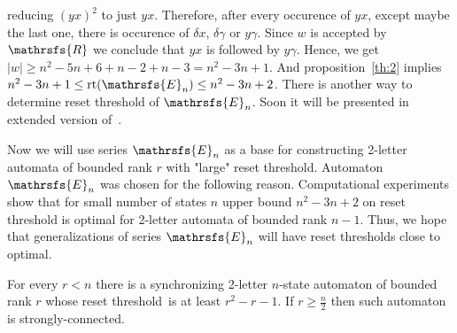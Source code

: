 \documentclass[11pt]{llncs}
\newcommand{\rl}{reset threshold}
\newcommand{\R}{\mathrsfs{R}}
\newcommand{\g}{\gamma}
\newcommand{\dl}{\delta}
\newcommand{\rt}{\mathrm{rt}}
\newcommand{\rtc}{\mathrm{rt}_{c}}
\begin{document}
reducing $(yx)^2$ to just $yx$. Therefore, after every occurence of $yx$, except maybe the last one, there is occurence 
of $\dl x$, $\dl \g$ or $y \g$. Since $w$ is accepted by $\R$ we conclude that $yx$ is followed by $y\g$.
Hence, we get $|w| \geq n^2 - 5n + 6 + n - 2 + n - 3 = n^2 -3n + 1$.
And proposition~\ref{th:2} implies $n^2 -3n + 1 \leq \rt(\mathrsfs{E}_n) \leq n^2 -3n + 2$. 
There is another way to determine reset threshold of $\mathrsfs{E}_n$. Soon it will be presented in
extended version of~\cite{AGV}.

Now we will use series $\mathrsfs{E}_n$ as a base for constructing 2-letter automata of bounded
rank $r$ with "large" reset threshold. Automaton $\mathrsfs{E}_n$ was chosen for the following reason.
Computational experiments show that for small number of states $n$ upper bound $n^2 -3n +2$ on reset threshold is optimal
for 2-letter automata of bounded rank $n - 1$.
Thus, we hope that generalizations of series $\mathrsfs{E}_n$ will have reset thresholds close to optimal.

\begin{proposition}
For every $r < n$ there is a synchronizing 2-letter $n$-state automaton of bounded rank $r$ whose \rl\ is at least 
$r^2 -r - 1$. If $r \geq \frac{n}{2}$ then such automaton is strongly-connected.
\end{proposition}
\end{document}
